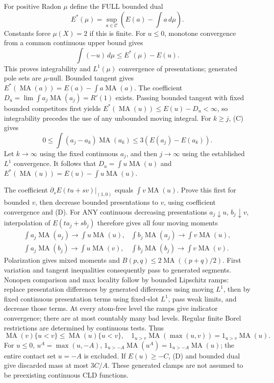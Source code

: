 \documentclass[11pt]{article}
\newcommand{\MA}{\operatorname{MA}}
\newcommand{\C}{\mathcal C}
\theoremstyle{remark}\newtheorem{remark}[theorem]{Remark}
\begin{document}
For positive Radon $\mu$ define the FULL bounded dual
\[
E^*(\mu)=\sup_{a\in\C}(E(a)-\int a\,d\mu).
\]
Constants force $\mu(X)=2$ if this is finite. For $u\le0$,
monotone convergence from a common continuous upper bound gives
\[
\int(-u)\,d\mu\le E^*(\mu)-E(u).
\tag{D}
\]
This proves integrability and $L^1(\mu)$ convergence of presentations;
generated pole sets are $\mu$-null. Bounded tangent gives
$E^*(\MA(a))=E(a)-\int a\MA(a)$.
The coefficient $D_u=\lim\int a_j\MA(a_j)=R'(1)$ exists.
Passing bounded tangent with fixed bounded competitors first yields
$E^*(\MA(u))\le E(u)-D_u<\infty$, so integrability precedes
the use of any unbounded moving integral. For $k\ge j$, (C) gives
\[
0\le\int(a_j-a_k)\MA(a_k)\le3(E(a_j)-E(a_k)).
\]
Let $k\to\infty$ using the fixed continuous $a_j$, and then
$j\to\infty$ using the established $L^1$ convergence. It follows
that $D_u=\int u\MA(u)$ and
$E^*(\MA(u))=E(u)-\int u\MA(u)$.

The coefficient $\partial_s E(tu+sv)|_{(1,0)}$ equals
$\int v\MA(u)$. Prove this first for bounded $v$, then decrease
bounded presentations to $v$, using coefficient convergence and (D).
For ANY continuous decreasing presentations $a_j\downarrow u$,
$b_j\downarrow v$, interpolation of $E(ta_j+sb_j)$ therefore gives
all four moving moments
\[
\begin{array}{ll}
\int a_j\MA(a_j)\to\int u\MA(u),&
\int b_j\MA(a_j)\to\int v\MA(u),\\
\int a_j\MA(b_j)\to\int u\MA(v),&
\int b_j\MA(b_j)\to\int v\MA(v).
\end{array}
\tag{4M}
\]
Polarization gives mixed moments and $B(p,q)\le2\MA((p+q)/2)$.
First variation and tangent inequalities consequently pass to generated
segments. Nonopen comparison and max locality follow by bounded
Lipschitz ramps: replace presentation differences by generated differences
using moving $L^1$, then by fixed continuous presentation terms using
fixed-slot $L^1$, pass weak limits, and decrease those terms. At every
atom-free level the ramps give indicator convergence; there are at most
countably many bad levels. Regular finite Borel restrictions are determined
by continuous tests. Thus
\[
\MA(v)\{u<v\}\le\MA(u)\{u<v\},\quad
1_{u>v}\MA(\max(u,v))=1_{u>v}\MA(u).
\]
For $u\le0$, $u^A=\max(u,-A)$,
$1_{u>-A}\MA(u^A)=1_{u>-A}\MA(u)$; the entire contact set
$u=-A$ is excluded. If $E(u)\ge-C$, (D) and bounded dual give discarded
mass at most $3C/A$. These generated clamps are not assumed to be
preexisting continuous CLD functions.
\end{document}
